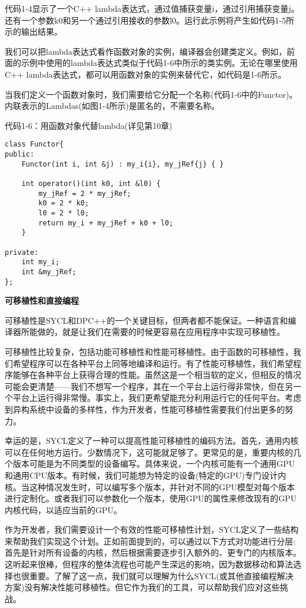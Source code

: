 代码1-4显示了一个C++ lambda表达式，通过值捕获变量i，通过引用捕获变量j。还有一个参数k0和另一个通过引用接收的参数l0。运行此示例将产生如代码1-5所示的输出结果。\par

我们可以把lambda表达式看作函数对象的实例，编译器会创建类定义。例如，前面的示例中使用的lambda表达式类似于代码1-6中所示的类实例。无论在哪里使用C++ lambda表达式，都可以用函数对象的实例来替代它，如代码是1-6所示。\par

当我们定义一个函数对象时，我们需要给它分配一个名称(代码1-6中的Functor)。内联表示的Lambdas(如图1-4所示)是匿名的，不需要名称。\par

代码1-6：用函数对象代替lambda(详见第10章)
\begin{lstlisting}[caption={}]
class Functor{
public:
	Functor(int i, int &j) : my_i{i}, my_jRef{j} { }
	
	int operator()(int k0, int &l0) {
		my_jRef = 2 * my_jRef;
		k0 = 2 * k0;
		l0 = 2 * l0;
		return my_i + my_jRef + k0 + l0;
	}

private:
	int my_i;
	int &my_jRef;
};
\end{lstlisting}

\hspace*{\fill} \par %
\textbf{可移植性和直接编程}

可移植性是SYCL和DPC++的一个关键目标，但两者都不能保证。一种语言和编译器所能做的，就是让我们在需要的时候更容易在应用程序中实现可移植性。\par

可移植性比较复杂，包括功能可移植性和性能可移植性。由于函数的可移植性，我们希望程序可以在各种平台上同等地编译和运行。有了性能可移植性，我们希望程序能够在各种平台上获得合理的性能。虽然这是一个相当软的定义，但相反的情况可能会更清楚——我们不想写一个程序，其在一个平台上运行得非常快，但在另一个平台上运行得非常慢。事实上，我们更希望能充分利用运行它的任何平台。考虑到异构系统中设备的多样性，作为开发者，性能可移植性需要我们付出更多的努力。\par

幸运的是，SYCL定义了一种可以提高性能可移植性的编码方法。首先，通用内核可以在任何地方运行。少数情况下，这可能就足够了。更常见的是，重要内核的几个版本可能是为不同类型的设备编写。具体来说，一个内核可能有一个通用GPU和通用CPU版本。有时候，我们可能想为特定的设备(特定的GPU)专门设计内核。当这种情况发生时，可以编写多个版本，并针对不同的GPU模型对每个版本进行定制化。或者我们可以参数化一个版本，使用GPU的属性来修改现有的GPU内核代码，以适应当前的GPU。\par

作为开发者，我们需要设计一个有效的性能可移植性计划，SYCL定义了一些结构来帮助我们实现这个计划。正如前面提到的，可以通过以下方式对功能进行分层:首先是针对所有设备的内核，然后根据需要逐步引入额外的、更专门的内核版本。这听起来很棒，但程序的整体流程也可能产生深远的影响，因为数据移动和算法选择也很重要。了解了这一点，我们就可以理解为什么SYCL(或其他直接编程解决方案)没有解决性能可移植性。但它作为我们的工具，可以帮助我们应对这些挑战。\par











